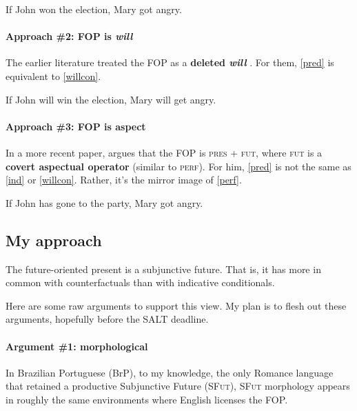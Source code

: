 \documentclass{linghandout}
\begin{document}
\ex\label{ind}If John won the election, Mary got angry.
\xe

\paragraph{Approach \#2: FOP is \textit{will}}The earlier literature treated the FOP as a \textbf{deleted \textit{will}} \citep{mccawley1971tense, comrie1985tense}. For them, \eqref{pred} is equivalent to \eqref{willcon}.

\ex\label{willcon}If John will win the election, Mary will get angry.
\xe

\paragraph{Approach \#3: FOP is aspect}In a more recent paper, \cite{williamson2021worlds} argues that the FOP is \textsc{pres + fut}, where \textsc{fut} is a \textbf{covert aspectual operator} (similar to \textsc{perf}). For him, \eqref{pred} is not the same as \eqref{ind} or \eqref{willcon}. Rather, it's the mirror image of \eqref{perf}.

\ex\label{perf}If John has gone to the party, Mary got angry.\xe

\subsection{My approach}

\begin{fancybox}{}
    The future-oriented present is a subjunctive future. That is, it has more in common with counterfactuals than with indicative conditionals.
\end{fancybox}



Here are some raw arguments to support this view. My plan is to flesh out these arguments, hopefully before the SALT deadline.

\paragraph{Argument \#1: morphological} In Brazilian Portuguese (BrP), to my knowledge, the only Romance language that retained a productive Subjunctive Future (\textsc{SFut}), \textsc{SFut} morphology appears in roughly the same environments where English licenses the FOP.
\end{document}
